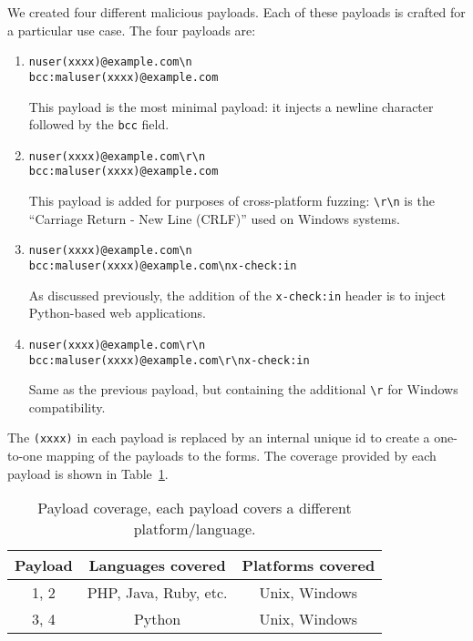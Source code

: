 We created four different malicious payloads. Each of these payloads is crafted for a particular use case. The four payloads are:

\begin{enumerate}
	\item
	\texttt{nuser(xxxx)@example.com\textbackslash{}n\\bcc:maluser(xxxx)@example.com} 
	
	This payload is the most minimal payload: it injects a newline character followed by the \texttt{bcc} field.
	
	\item \texttt{nuser(xxxx)@example.com\textbackslash{}r\textbackslash{}n\\bcc:maluser(xxxx)@example.com}
	
	This payload is added for purposes of cross-platform fuzzing: \texttt{\textbackslash{}r\textbackslash{}n} is the ``Carriage Return - New Line (CRLF)'' used on Windows systems.~\cite{rfc2616}
	
	\item \texttt{nuser(xxxx)@example.com\textbackslash{}n\\bcc:maluser(xxxx)@example.com\textbackslash{}nx-check:in}
	
	As discussed previously, the addition of the \texttt{x-check:in} header is to inject Python-based web applications.
	
	\item \texttt{nuser(xxxx)@example.com\textbackslash{}r\textbackslash{}n\\bcc:maluser(xxxx)@example.com\textbackslash{}r\textbackslash{}nx-check:in}
	
	Same as the previous payload, but containing the additional \texttt{\textbackslash{}r} for Windows compatibility.
	
\end{enumerate}
The \texttt{(xxxx)} in each payload is replaced by an internal unique id to create a one-to-one mapping of the payloads to the forms.
The coverage provided by each payload is shown in Table~\ref{tab:payloadcov}.\\

\begin{table}[tbp]
	\centering
	\begin{tabular}{|c|c|c|}
		\hline
		\multicolumn{1}{|c|}{\textbf{Payload}} & \multicolumn{1}{c}{\textbf{Languages covered}} & \multicolumn{1}{|c|}{\textbf{Platforms covered}}\\
		\hline
		1, 2 & PHP, Java, Ruby, etc. & Unix, Windows\\
		\hline
		3, 4 & Python & Unix, Windows\\
		\hline
	\end{tabular}
	\caption[]{Payload coverage, each payload covers a different platform/language.}
	\label{tab:payloadcov}
\end{table}

